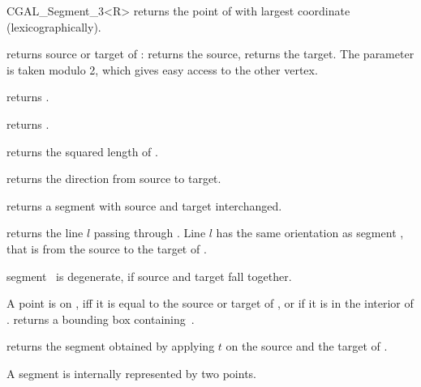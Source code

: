 \begin {classtemplate} {CGAL_Segment_3<R>}
       {returns the point of \var with largest coordinate (lexicographically).}


       {returns source or target of \var:    returns
        the source,  returns the target. 
        The parameter  is taken modulo 2, which gives 
        easy access to the other vertex.}

       {returns .}

       {returns .}

       {returns the squared length of \var. }

       {returns the direction from source to target.}


       {returns a segment with source and target interchanged.}

       {returns the line $l$ passing through \var. Line $l$  has the
        same orientation as segment \var, that is 
        from the source to the target of \var.}

       {segment \var\ is degenerate, if source and target fall together.}


       {A point is on \var, iff it is equal to the source or target
        of \var, or if it is in the interior of \var.}
% 
% 
       {returns a bounding box containing~\var.}

       {returns the segment obtained by applying $t$ on the source
        and the target of \var.}

\implementation
A segment is internally represented by two points. 


\end{classtemplate} 

%
%
%
